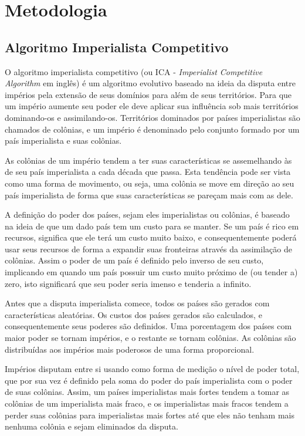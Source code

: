 \chapter{Metodologia}
\label{Metodologia}





\section{Algoritmo Imperialista Competitivo}

O algoritmo imperialista competitivo \cite{atashpaz2007imperialist} (ou ICA - \emph{Imperialist Competitive Algorithm} em inglês) é um algoritmo evolutivo baseado na ideia da disputa entre impérios pela extensão de seus domínios para além de seus territórios. Para que um império aumente seu poder ele deve aplicar sua influência sob mais territórios dominando-os e assimilando-os. Territórios dominados por países imperialistas são chamados de colônias, e um império é denominado pelo conjunto formado por um país imperialista e suas colônias.

As colônias de um império tendem a ter suas características se assemelhando às de seu país imperialista a cada década que passa. Esta tendência pode ser vista como uma forma de movimento, ou seja, uma colônia se move em direção ao seu país imperialista de forma que suas características se pareçam mais com as dele.

A definição do poder dos países, sejam eles imperialistas ou colônias, é baseado na ideia de que um dado país tem um custo para se manter. Se um país é rico em recursos, significa que ele terá um custo muito baixo, e consequentemente poderá usar seus recursos de forma a expandir suas fronteiras através da assimilação de colônias. Assim o poder de um país é definido pelo inverso de seu custo, implicando em quando um país possuir um custo muito próximo de (ou tender a) zero, isto significará que seu poder seria imenso e tenderia a infinito.

Antes que a disputa imperialista comece, todos os países são gerados com características aleatórias. Os custos dos países gerados são calculados, e consequentemente seus poderes são definidos. Uma porcentagem dos países com maior poder se tornam impérios, e o restante se tornam colônias. As colônias são distribuídas aos impérios mais poderosos de uma forma proporcional.

Impérios disputam entre si usando como forma de medição o nível de poder total, que por sua vez é definido pela soma do poder do país imperialista com o poder de suas colônias. Assim, um países imperialistas mais fortes tendem a tomar as colônias de um imperialista mais fraco, e os imperialistas mais fracos tendem a perder suas colônias para imperialistas mais fortes até que eles não tenham mais nenhuma colônia e sejam eliminados da disputa. 

